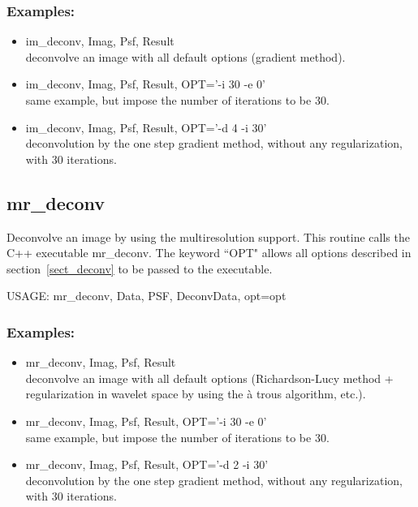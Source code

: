\subsubsection*{Examples:} 
\begin{itemize}
\item im\_deconv, Imag, Psf, Result \\
deconvolve an image with all default options (gradient method).
\item  im\_deconv, Imag, Psf, Result, OPT='-i 30 -e 0' \\
same example, but impose the number of iterations to be 30.
\item  im\_deconv, Imag, Psf, Result, OPT='-d 4 -i 30' \\
deconvolution by the one step gradient method, without 
any regularization, with 30 iterations.
\end{itemize}


\subsection{mr\_deconv}
Deconvolve an image by using the multiresolution support. This routine calls 
the C++ executable {mr\_deconv}. The keyword ``OPT" 
allows 
all options described in section~\ref{sect_deconv} to be passed 
to the executable.

{\bf
\begin{center}
     USAGE: mr\_deconv, Data, PSF, DeconvData, opt=opt
\end{center}}
\subsubsection*{Examples:} 
\begin{itemize}
\item mr\_deconv, Imag, Psf, Result \\
deconvolve an image with all default options (Richardson-Lucy method + 
regularization in  wavelet space by using the \`a trous 
algorithm, etc.).
\item  mr\_deconv, Imag, Psf, Result, OPT='-i 30 -e 0'  \\
same example, but impose the number of iterations to be 30.
\item  mr\_deconv, Imag, Psf, Result, OPT='-d 2 -i 30' \\
deconvolution by the one step gradient method, without 
any regularization, with 30 iterations.
\end{itemize}

